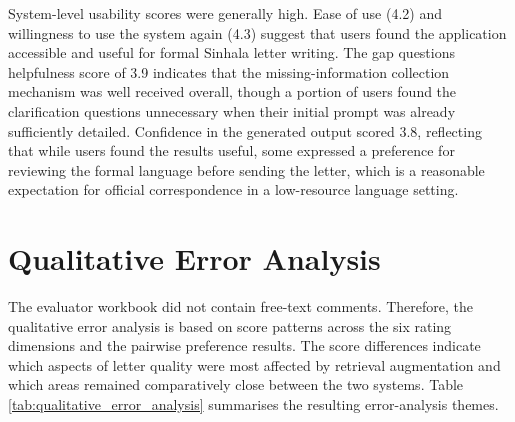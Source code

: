 \documentclass[12pt]{uomthesis}
\begin{document}
System-level usability scores were generally high. Ease of use (4.2) and willingness to use the system again (4.3) suggest that users found the application accessible and useful for formal Sinhala letter writing. The gap questions helpfulness score of 3.9 indicates that the missing-information collection mechanism was well received overall, though a portion of users found the clarification questions unnecessary when their initial prompt was already sufficiently detailed. Confidence in the generated output scored 3.8, reflecting that while users found the results useful, some expressed a preference for reviewing the formal language before sending the letter, which is a reasonable expectation for official correspondence in a low-resource language setting.

\section{Qualitative Error Analysis}

The evaluator workbook did not contain free-text comments. Therefore, the qualitative error analysis is based on score patterns across the six rating dimensions and the pairwise preference results. The score differences indicate which aspects of letter quality were most affected by retrieval augmentation and which areas remained comparatively close between the two systems. Table \ref{tab:qualitative_error_analysis} summarises the resulting error-analysis themes.
\end{document}
